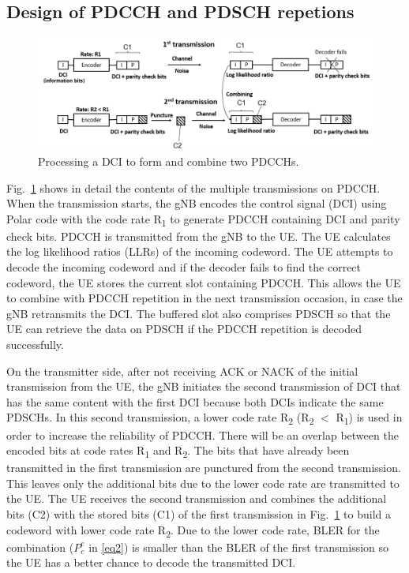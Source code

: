 \documentclass[conference,10pt]{IEEEtran}
\begin{document}
\subsection{Design of PDCCH and PDSCH repetions}\label{BB}
\begin{figure}[htbp]
\centerline{\includegraphics[scale=0.35]{fig3.png}}
\caption{Processing a DCI to form and combine two PDCCHs.}
\label{fig3}
\end{figure}

Fig.~\ref{fig3} shows in detail the contents of the multiple transmissions on PDCCH. When the transmission starts, the gNB encodes the control signal (DCI) using Polar code with the code rate R\textsubscript{1} to generate PDCCH containing DCI and parity check bits. PDCCH is transmitted from the gNB to the UE. The UE calculates the log likelihood ratios (LLRs) of the incoming codeword. The UE attempts to decode the incoming codeword and if the decoder fails to find the correct codeword, the UE stores the current slot containing PDCCH. This allows the UE to combine with PDCCH repetition in the next transmission occasion, in case the gNB retransmits the DCI. The buffered slot also comprises PDSCH so that the UE can retrieve the data on PDSCH if the PDCCH repetition is decoded successfully.

On the transmitter side, after not receiving ACK or NACK of the initial transmission from the UE, the gNB initiates the second transmission of DCI that has the same content with the first
DCI because both DCIs indicate the same PDSCHs. In this second transmission, a lower code rate R\textsubscript{2} (R\textsubscript{2} $<$ R\textsubscript{1}) is used in order to increase the reliability of PDCCH. There will be an overlap between the encoded bits at code rates R\textsubscript{1} and R\textsubscript{2}. The bits that have already been transmitted in the first transmission are punctured from the second transmission. This leaves only the additional bits due to the lower code rate are transmitted to the UE. The UE receives the second transmission and combines the additional bits (C2) with the stored bits (C1) of the first transmission in Fig.~\ref{fig3} to build a codeword with lower code rate R\textsubscript{2}. Due to the lower code rate, BLER for the combination ($P^{e}_{c}$ in \eqref{eq2}) is smaller than the BLER of the first transmission so the UE has a better chance to decode the transmitted DCI.
\end{document}
